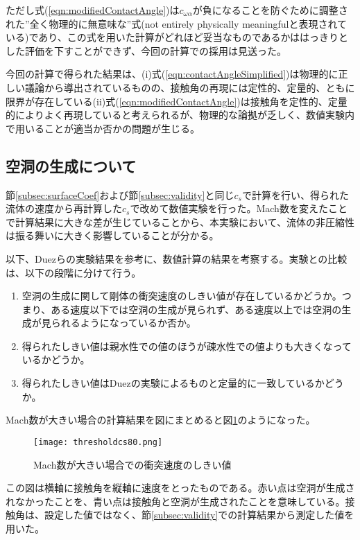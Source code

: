 \documentclass[]{jsarticle}
\begin{document}
ただし式(\ref{eqn:modifiedContactAngle})は$c_{\omega\alpha}$が負になることを防ぐために調整された”全く物理的に無意味な”式(not entirely physically meaningfulと表現されている\cite{Yang2017})であり、この式を用いた計算がどれほど妥当なものであるかははっきりとした評価を下すことができず、今回の計算での採用は見送った。

今回の計算で得られた結果は、(i)式(\ref{eqn:contactAngleSimplified})は物理的に正しい議論から導出されているものの、接触角の再現には定性的、定量的、ともに限界が存在している(ii)式(\ref{eqn:modifiedContactAngle})は接触角を定性的、定量的によりよく再現していると考えられるが、物理的な論拠が乏しく、数値実験内で用いることが適当か否かの問題が生じる。

\subsection{空洞の生成について}
\label{subsec:discCavityForm}
節\ref{subsec:surfaceCoef}および節\ref{subsec:validity}と同じ$c_s$で計算を行い、得られた流体の速度から再計算した$c_s$で改めて数値実験を行った。Mach数を変えたことで計算結果に大きな差が生じていることから、本実験において、流体の非圧縮性は振る舞いに大きく影響していることが分かる。

以下、Duezらの実験結果を参考に、数値計算の結果を考察する。実験との比較は、以下の段階に分けて行う。
\begin{enumerate}
\item 空洞の生成に関して剛体の衝突速度のしきい値が存在しているかどうか。つまり、ある速度以下では空洞の生成が見られず、ある速度以上では空洞の生成が見られるようになっているか否か。
\item 得られたしきい値は親水性での値のほうが疎水性での値よりも大きくなっているかどうか。
\item 得られたしきい値はDuezの実験によるものと定量的に一致しているかどうか。
\end{enumerate}


Mach数が大きい場合の計算結果を図にまとめると図\ref{fig:threscs80}のようになった。
\begin{figure}[H]
  \centering
  \texttt{[image: thresholdcs80.png]}
  \caption{Mach数が大きい場合での衝突速度のしきい値
    \label{fig:threscs80} }
\end{figure}

この図は横軸に接触角を縦軸に速度をとったものである。赤い点は空洞が生成されなかったことを、青い点は接触角と空洞が生成されたことを意味している。接触角は、設定した値ではなく、節\ref{subsec:validity}での計算結果から測定した値を用いた。
\end{document}
